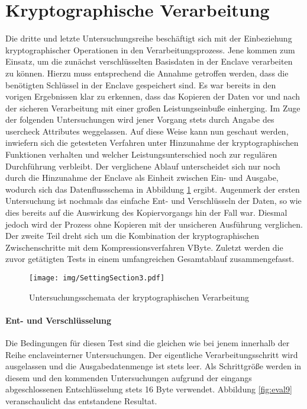\section{Kryptographische Verarbeitung}

Die dritte und letzte Untersuchungsreihe beschäftigt sich mit der Einbeziehung kryptographischer Operationen in den Verarbeitungsprozess. Jene kommen zum Einsatz, um die zunächst verschlüsselten Basisdaten in der Enclave verarbeiten zu können. Hierzu muss entsprechend die Annahme getroffen werden, dass die benötigten Schlüssel in der Enclave gespeichert sind. Es war bereits in den vorigen Ergebnissen klar zu erkennen, dass das Kopieren der Daten vor und nach der sicheren Verarbeitung mit einer großen Leistungseinbuße einherging. Im Zuge der folgenden Untersuchungen wird jener Vorgang stets durch Angabe des user\textunderscore check Attributes weggelassen. Auf diese Weise kann nun geschaut werden, inwiefern sich die getesteten Verfahren unter Hinzunahme der kryptographischen Funktionen verhalten und welcher Leistungsunterschied noch zur regulären Durchführung verbleibt. Der verglichene Ablauf unterscheidet sich nur noch durch die Hinzunahme der Enclave als Einheit zwischen Ein- und Ausgabe, wodurch sich das Datenflussschema in Abbildung \ref{fig:settingsection3} ergibt. Augenmerk der ersten Untersuchung ist nochmals das einfache Ent- und Verschlüsseln der Daten, so wie dies bereits auf die Auswirkung des Kopiervorgangs hin der Fall war. Diesmal jedoch wird der Prozess ohne Kopieren mit der unsicheren Ausführung verglichen. Der zweite Teil dreht sich um die Kombination der kryptographischen Zwischenschritte mit dem Kompressionsverfahren VByte. Zuletzt werden die zuvor getätigten Tests in einem umfangreichen Gesamtablauf zusammengefasst.

\begin{figure}[H]
	\texttt{[image: img/SettingSection3.pdf]}
	\centering
	\caption{Untersuchungsschemata der kryptographischen Verarbeitung}
	\label{fig:settingsection3}
\end{figure}

\paragraph{Ent- und Verschlüsselung}

Die Bedingungen für diesen Test sind die gleichen wie bei jenem innerhalb der Reihe enclaveinterner Untersuchungen. Der eigentliche Verarbeitungsschritt wird ausgelassen und die Ausgabedatenmenge ist stets leer. Als Schrittgröße werden in diesem und den kommenden Untersuchungen aufgrund der eingangs abgeschlossenen Entschlüsselung stets 16 Byte verwendet. Abbildung \ref{fig:eval9} veranschaulicht das entstandene Resultat.

